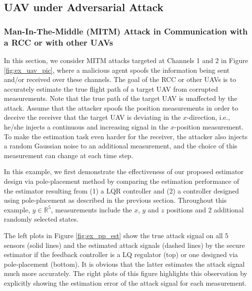 \documentclass[../../thesis.tex]{subfiles}
\begin{document}
\subsection{UAV under Adversarial Attack}

\subsubsection{Man-In-The-Middle (MITM) Attack in Communication with a RCC or with other UAVs} \label{sec:uav_utm}

In this section, we consider MITM attacks targeted at Channels 1 and 2 in Figure \ref{fig:ex_uav_pic}, where a malicious agent spoofs the information being sent and/or received over these channels. The goal of the RCC or other UAVs is to accurately estimate the true flight path of a target UAV from corrupted measurements. 
Note that the true path of the target UAV is unaffected by the attack.
Assume that the attacker spoofs the position measurements in order to deceive the receiver that the target UAV is deviating in the $x$-direction, i.e., he/she injects a continuous and increasing signal in the $x$-position measurement.
To make the estimation task even harder for the receiver, the attacker also injects a random Gaussian noise to an additional measurement, and the choice of this measurement can change at each time step. 

In this example, we first demonstrate the effectiveness of our proposed estimator design via pole-placement method by comparing the estimation performance of the estimator resulting from (1) a LQR controller and (2) a controller designed using pole-placement as described in the previous section.
Throughout this example, $y \in \mathbb{R}^5$, measurements include the $x$, $y$ and $z$ positions and 2 additional randomly selected states. 

The left plots in Figure \ref{fig:ex_pp_est} show the true attack signal on all 5 sensors (solid lines) and the estimated attack signals (dashed lines) by the secure estimator if the feedback controller is a LQ regulator (top) or one designed via pole-placement (bottom). It is obvious that the latter estimates the attack signal much more accurately. The right plots of this figure highlights this observation by explicitly showing the estimation error of the attack signal for each measurement.
\end{document}
